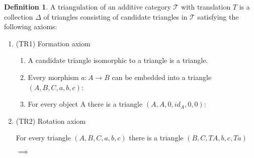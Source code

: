 \documentclass[11pt]{article}
\theoremstyle{definition}
\newtheorem{definition}{Definition}[section]
\theoremstyle{remark}
\begin{document}
            \begin{definition}
                A triangulation of an additive category $\mathcal{T}$ with translation $T$ is a collection $\Delta$ of triangles consisting of candidate triangles in $\mathcal{T}$ satisfying the following axioms: 

                \begin{enumerate}
                    \item (TR1) Formation axiom

                        \begin{enumerate}
                            \item A candidate triangle isomorphic to a triangle is a triangle.
                            \item Every morphism $a : A \rightarrow B$ can be embedded into a triangle $(A,B,C,a,b,c)$:
                            \begin{center}
                            \end{center}
                            \item For every object A there is a triangle $(A,A,0,id_A,0,0)$:
                            \begin{center}
                            \end{center}
                        \end{enumerate}
                    \item (TR2) Rotation axiom

                        For every triangle $(A,B,C,a,b,c)$ there is a triangle $(B,C,TA,b,c,Ta)$
                        \begin{center}
                             $\implies$
                            

\end{center}
\end{enumerate}
\end{definition}
\end{document}
